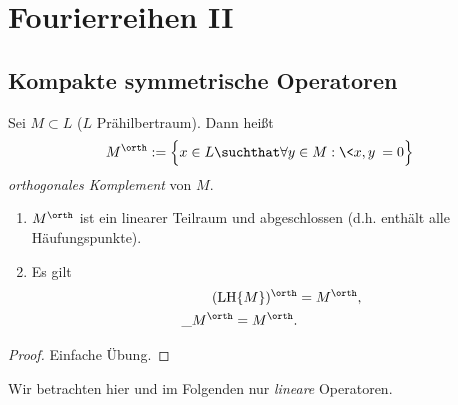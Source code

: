 
\chapter{Fourierreihen II}

\section{Kompakte symmetrische Operatoren}


\begin{df} \label{3.1}
	Sei $M \subset L$ ($L$ Prähilbertraum).
	Dann heißt
	\[
		M^\orth := \Big\{ x \in L \suchthat \forall y \in M : \<x,y\> = 0 \Big\}
	\]
	\emph{orthogonales Komplement} von $M$.
\end{df}

\begin{st} \label{3.2}
	\begin{enumerate}[1)]
		\item
			$M^\orth$ ist ein linearer Teilraum und abgeschlossen (d.h. enthält alle Häufungspunkte).
		\item Es gilt
			\begin{align*}
				(\LH \{M\})^\orth &= M^\orth ,\\
				\_M^\orth = M^\orth.
			\end{align*}
	\end{enumerate}
	\begin{proof}
		Einfache Übung.
	\end{proof}
\end{st}

\begin{conv*}
	Wir betrachten hier und im Folgenden nur \emph{lineare} Operatoren.
\end{conv*}

